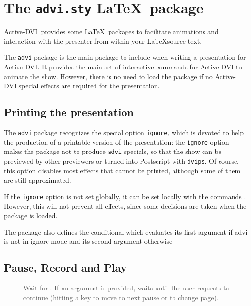 \documentclass[12pt]{article}
\def \ActiveDVI {Active-DVI}
\begin{document}
\section {The {\tt advi.sty} \LaTeX~package}

\ActiveDVI~provides some \LaTeX~packages to facilitate animations and
interaction with the presenter from within your \LaTeX source text.

The {\tt advi} package is the main package to include when writing
a presentation for \ActiveDVI. It provides the main set of interactive
commands for {\ActiveDVI} to animate the show. However, there is no
need to load the package if no {\ActiveDVI} special effects are
required for the presentation.

\subsection{Printing the presentation}

The {\tt advi} package recognizes the special option \verb"ignore",
which is devoted to help the production of a printable version of the
presentation: the \verb"ignore" option makes the package not to
produce {\tt advi} specials, so that the show can be previewed by
other previewers or turned into Postscript with {\tt dvips}. Of
course, this option disables most effects that cannot be printed,
although some of them are still approximated.

If the {\tt ignore} option is not set globally, it can be set
locally with the commands {\docdef \adviignore}. However, this will not
prevent all effects, since some decisions are taken when the package is
loaded.

The package also defines the conditional {\docdef \ifadvi} which
evaluates its first argument if advi is not in ignore mode and its
second argument otherwise.

\subsection {Pause, Record and Play}

\medskip\noindent
\docdef \adviwait{}
\begin{quote}
Wait for . If no argument is provided, waits until the
user requests to continue (hitting a key to move to next pause or to
change page).
\end{quote}
\end{document}
